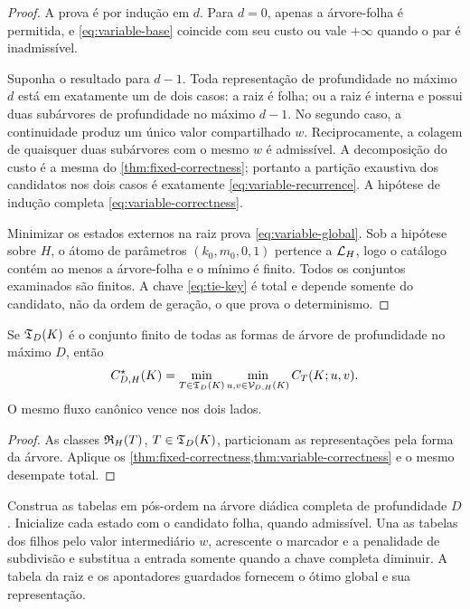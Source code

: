 \begin{proof}
A prova é por indução em $d$. Para $d=0$, apenas a árvore-folha é permitida,
e \eqref{eq:variable-base} coincide com seu custo ou vale $+\infty$ quando o
par é inadmissível.

Suponha o resultado para $d-1$. Toda representação de profundidade no máximo
$d$ está em exatamente um de dois casos: a raiz é folha; ou a raiz é interna
e possui duas subárvores de profundidade no máximo $d-1$. No segundo caso, a
continuidade produz um único valor compartilhado $w$. Reciprocamente, a
colagem de quaisquer duas subárvores com o mesmo $w$ é admissível. A
decomposição do custo é a mesma do \cref{thm:fixed-correctness}; portanto a
partição exaustiva dos candidatos nos dois casos é exatamente
\eqref{eq:variable-recurrence}. A hipótese de indução completa
\eqref{eq:variable-correctness}.

Minimizar os estados externos na raiz prova \eqref{eq:variable-global}. Sob a
hipótese sobre $H$, o átomo de parâmetros $(k_0,m_0,0,1)$ pertence a
$\mathcal{L}_H$, logo o catálogo contém ao menos a árvore-folha e o mínimo é
finito. Todos os conjuntos examinados são finitos. A chave
\eqref{eq:tie-key} é total e depende somente do candidato, não da ordem de
geração, o que prova o determinismo.
\end{proof}

\begin{corollary}
\label{cor:shape-enumeration}
Se $\mathfrak{T}_D(K)$ é o conjunto finito de todas as formas de árvore de
profundidade no máximo $D$, então
\begin{equation}
 C_{D,H}^{\star}(K)
 =\min_{T\in\mathfrak{T}_D(K)}
   \min_{u,v\in\mathcal{V}_{D,H}(K)}C_T(K;u,v).
 \label{eq:shape-equivalence}
\end{equation}
O mesmo fluxo canônico vence nos dois lados.
\end{corollary}

\begin{proof}
As classes $\mathfrak{R}_H(T)$, $T\in\mathfrak{T}_D(K)$, particionam as
representações pela forma da árvore. Aplique os
\cref{thm:fixed-correctness,thm:variable-correctness} e o mesmo desempate
total.
\end{proof}

\begin{algorithm}
\label{alg:variable-tree}
Construa as tabelas em pós-ordem na árvore diádica completa de profundidade
$D$. Inicialize cada estado com o candidato folha, quando admissível. Una as
tabelas dos filhos pelo valor intermediário $w$, acrescente o marcador e a
penalidade de subdivisão e substitua a entrada somente quando a chave completa
diminuir. A tabela da raiz e os apontadores guardados fornecem o ótimo global
e sua representação.
\end{algorithm}
